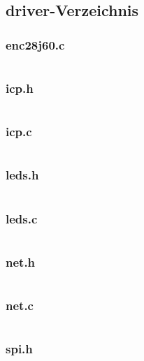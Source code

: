 \begin{landscape}
\begin{multicols}{2}
		\subsection*{driver-Verzeichnis}
		\subsubsection*{enc28j60.c}
		\inputminted[fontsize=\scriptsize,linenos,tabsize=4]{c}{./code/firmware/driver/enc28j60.c}

		\subsubsection*{icp.h}
		\inputminted[fontsize=\scriptsize,linenos,tabsize=4]{c}{./code/firmware/driver/icp.h}

		\subsubsection*{icp.c}
		\inputminted[fontsize=\scriptsize,linenos,tabsize=4]{c}{./code/firmware/driver/icp.c}

		\subsubsection*{leds.h}
		\inputminted[fontsize=\scriptsize,linenos,tabsize=4]{c}{./code/firmware/driver/leds.h}

		\subsubsection*{leds.c}
		\inputminted[fontsize=\scriptsize,linenos,tabsize=4]{c}{./code/firmware/driver/leds.c}

		\subsubsection*{net.h}
		\inputminted[fontsize=\scriptsize,linenos,tabsize=4]{c}{./code/firmware/driver/net.h}

		\subsubsection*{net.c}
		\inputminted[fontsize=\scriptsize,linenos,tabsize=4]{c}{./code/firmware/driver/net.c}

		\subsubsection*{spi.h}
		\inputminted[fontsize=\scriptsize,linenos,tabsize=4]{c}{./code/firmware/driver/spi.h}


\end{multicols}
\end{landscape}
